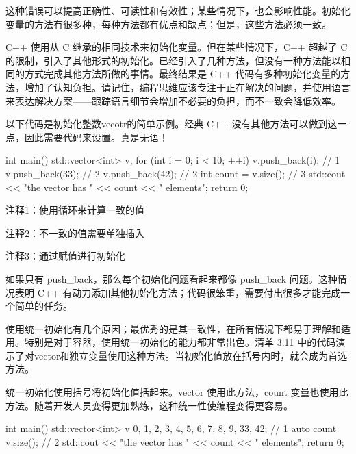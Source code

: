 ﻿这种错误可以提高正确性、可读性和有效性；某些情况下，也会影响性能。初始化变量的方法有很多种，每种方法都有优点和缺点；但是，这些方法必须一致。


C++ 使用从 C 继承的相同技术来初始化变量。但在某些情况下，C++ 超越了 C 的限制，引入了其他形式的初始化。已经引入了几种方法，但没有一种方法能以相同的方式完成其他方法所做的事情。最终结果是 C++ 代码有多种初始化变量的方法，增加了认知负担。请记住，编程思维应该专注于正在解决的问题，并使用语言来表达解决方案——跟踪语言细节会增加不必要的负担，而不一致会降低效率。

以下代码是初始化整数vecotr的简单示例。经典 C++ 没有其他方法可以做到这一点，因此需要代码来设置。真是无语！


\begin{cpp}
int main() {
  std::vector<int> v;
  for (int i = 0; i < 10; ++i)
    v.push_back(i); // 1
  v.push_back(33); // 2
  v.push_back(42); // 2
  int count = v.size(); // 3
  std::cout << "the vector has " << count << " elements\n";
  return 0;
}
\end{cpp}

{\footnotesize
注释1：使用循环来计算一致的值

注释2：不一致的值需要单独插入

注释3：通过赋值进行初始化
}


如果只有 push\_back，那么每个初始化问题看起来都像 push\_back 问题。这种情况表明 C++ 有动力添加其他初始化方法；代码很笨重，需要付出很多才能完成一个简单的任务。


使用统一初始化有几个原因；最优秀的是其一致性，在所有情况下都易于理解和适用。特别是对于容器，使用统一初始化的能力都非常出色。清单 3.11 中的代码演示了对vector和独立变量使用这种方法。当初始化值放在括号内时，就会成为首选方法。

统一初始化使用括号将初始化值括起来。vector 使用此方法，count 变量也使用此方法。随着开发人员变得更加熟练，这种统一性使编程变得更容易。


\begin{cpp}
int main() {
  std::vector<int> v {0, 1, 2, 3, 4, 5, 6, 7, 8, 9, 33, 42}; // 1
  auto count {v.size()}; // 2
  std::cout << "the vector has " << count << " elements\n";
  return 0;
}
\end{cpp}

